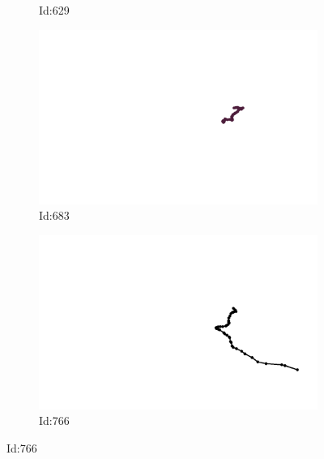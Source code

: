 \documentclass[12pt,twoside]{report}
\begin{document}
\begin{figure}
\begin{subfigure}[b]{0.20\textwidth}
\caption{Id:629}
\end{subfigure}
\begin{subfigure}[b]{0.20\textwidth}
\centering
\includegraphics[width=\textwidth]{../trajectories/683.png}
\caption{Id:683}
\end{subfigure}
\begin{subfigure}[b]{0.20\textwidth}
\centering
\includegraphics[width=\textwidth]{../trajectories/766.png}
\caption{Id:766}
\end{subfigure}
\end{figure}
\end{document}
